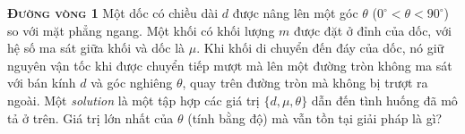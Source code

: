 \begin{problem}
{\textbf{\textsc{Đường vòng 1}}} Một dốc có chiều dài $d$ được nâng lên một góc $\theta$ ($0^{\circ} < \theta < 90^{\circ}$) so với mặt phẳng ngang. Một khối có khối lượng $m$ được đặt ở đỉnh của dốc, với hệ số ma sát giữa khối và dốc là $\mu$. Khi khối di chuyển đến đáy của dốc, nó giữ nguyên vận tốc khi được chuyển tiếp mượt mà lên một đường tròn không ma sát với bán kính $d$ và góc nghiêng $\theta$, quay trên đường tròn mà không bị trượt ra ngoài. Một \emph{solution} là một tập hợp các giá trị $\{d, \mu, \theta\}$ dẫn đến tình huống đã mô tả ở trên. Giá trị lớn nhất của $\theta$ (tính bằng độ) mà vẫn tồn tại giải pháp là gì? 

\end{problem}
